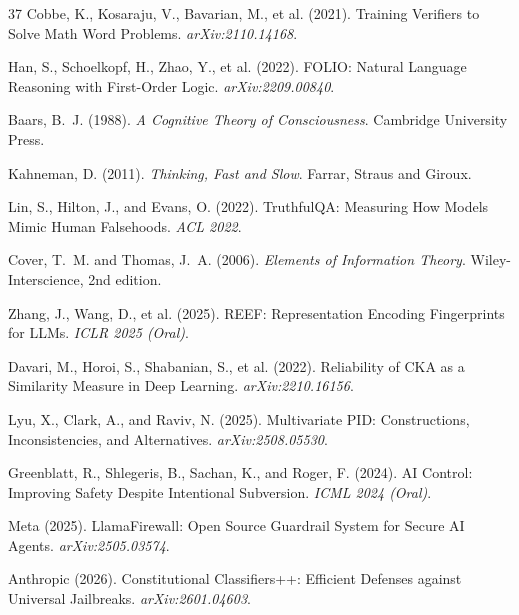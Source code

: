 \documentclass[11pt,a4paper]{article}
\theoremstyle{definition}
\begin{document}
\begin{thebibliography}{37}
Cobbe, K., Kosaraju, V., Bavarian, M., et al. (2021).
\newblock Training Verifiers to Solve Math Word Problems.
\newblock \emph{arXiv:2110.14168}.

Han, S., Schoelkopf, H., Zhao, Y., et al. (2022).
\newblock FOLIO: Natural Language Reasoning with First-Order Logic.
\newblock \emph{arXiv:2209.00840}.

Baars, B.~J. (1988).
\newblock \emph{A Cognitive Theory of Consciousness}.
\newblock Cambridge University Press.

Kahneman, D. (2011).
\newblock \emph{Thinking, Fast and Slow}.
\newblock Farrar, Straus and Giroux.

Lin, S., Hilton, J., and Evans, O. (2022).
\newblock TruthfulQA: Measuring How Models Mimic Human Falsehoods.
\newblock \emph{ACL 2022}.

Cover, T.~M. and Thomas, J.~A. (2006).
\newblock \emph{Elements of Information Theory}.
\newblock Wiley-Interscience, 2nd edition.

Zhang, J., Wang, D., et al. (2025).
\newblock REEF: Representation Encoding Fingerprints for LLMs.
\newblock \emph{ICLR 2025 (Oral)}.

Davari, M., Horoi, S., Shabanian, S., et al. (2022).
\newblock Reliability of CKA as a Similarity Measure in Deep Learning.
\newblock \emph{arXiv:2210.16156}.

Lyu, X., Clark, A., and Raviv, N. (2025).
\newblock Multivariate PID: Constructions, Inconsistencies, and Alternatives.
\newblock \emph{arXiv:2508.05530}.

Greenblatt, R., Shlegeris, B., Sachan, K., and Roger, F. (2024).
\newblock AI Control: Improving Safety Despite Intentional Subversion.
\newblock \emph{ICML 2024 (Oral)}.

Meta (2025).
\newblock LlamaFirewall: Open Source Guardrail System for Secure AI Agents.
\newblock \emph{arXiv:2505.03574}.

Anthropic (2026).
\newblock Constitutional Classifiers++: Efficient Defenses against Universal Jailbreaks.
\newblock \emph{arXiv:2601.04603}.


\end{thebibliography}
\end{document}
